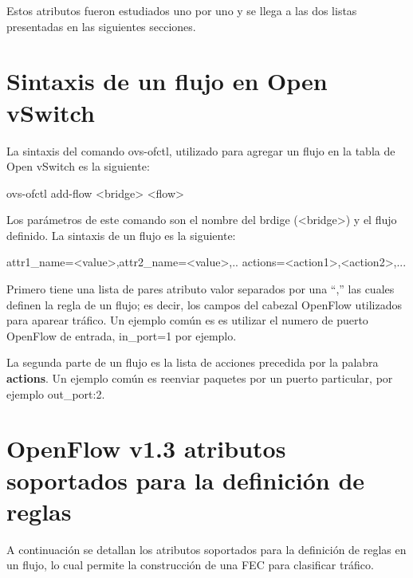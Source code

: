 Estos atributos fueron estudiados uno por uno y se llega a las dos listas presentadas en las siguientes secciones.\\

\section{Sintaxis de un flujo en Open vSwitch}
La sintaxis del comando ovs-ofctl, utilizado para agregar un flujo en la tabla de Open vSwitch es la siguiente:

\begin{center}
ovs-ofctl add-flow <bridge> <flow>
\end{center}

Los parámetros de este comando son el nombre del brdige (<bridge>) y el flujo definido. La sintaxis de un flujo es la siguiente:

\begin{center}
attr1\_name=<value>,attr2\_name=<value>,.. actions=<action1>,<action2>,...
\end{center}

Primero tiene una lista de pares atributo valor separados por una “,” las cuales definen la regla de un flujo; es decir, los campos del cabezal OpenFlow utilizados para aparear tr\'afico. Un ejemplo común es es utilizar el numero de puerto OpenFlow de entrada, in\_port=1 por ejemplo.

La segunda parte de un flujo es la lista de acciones precedida por la palabra \textbf{actions}. Un ejemplo común es reenviar paquetes por un puerto particular, por ejemplo out\_port:2. 
 
\section{OpenFlow v1.3 atributos soportados para la definici\'on de reglas}

A continuaci\'on se detallan los atributos soportados para la definici\'on de reglas en un flujo, lo cual permite la construcci\'on de una FEC para clasificar tr\'afico.

